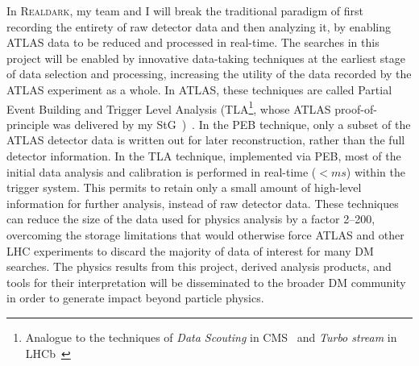 \documentclass[11pt,a4paper]{article}
\begin{document}
In \textsc{Realdark}, my team and I will break the traditional paradigm of first recording the entirety of raw detector data and then analyzing it, by enabling ATLAS data to be reduced and processed in real-time.  
The searches in this project will be enabled by innovative data-taking techniques at the earliest stage of data selection and processing, increasing the utility of the data recorded by the ATLAS experiment as a whole. 
In ATLAS, these techniques are called Partial Event Building and Trigger Level Analysis (TLA\footnote{Analogue to the techniques of \textit{Data Scouting} in CMS~\cite{Khachatryan:2016ecr} and \textit{Turbo stream} in LHCb~\cite{Aaij:2016rxn}}, whose ATLAS proof-of-principle was delivered by my StG~\cite{Aaboud:2018fzt})~\cite{Aaboud:2016leb}. 
In the PEB technique, only a subset of the ATLAS detector data is written out for later reconstruction, rather than the full detector information. 
In the TLA technique, implemented via PEB, most of the initial data analysis and calibration is performed in real-time ($< ms$) within the trigger system. 
This permits to retain only a small amount of high-level information for further analysis, instead of raw detector data. 
These techniques can reduce the size of the data used for physics analysis by a factor 2--200, 
overcoming the storage limitations that would otherwise force ATLAS and other LHC experiments to discard the majority of data of interest for many DM searches.
The physics results from this project, derived analysis products, and tools for their interpretation will be disseminated to the broader DM community in order to generate  impact beyond particle physics. %
\end{document}
